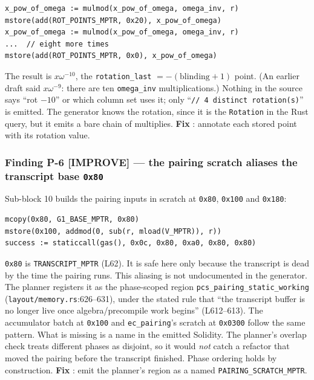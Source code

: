 \begin{lstlisting}[style=yul]
x_pow_of_omega := mulmod(x_pow_of_omega, omega_inv, r)
mstore(add(ROT_POINTS_MPTR, 0x20), x_pow_of_omega)
x_pow_of_omega := mulmod(x_pow_of_omega, omega_inv, r)
...  // eight more times
mstore(add(ROT_POINTS_MPTR, 0x0), x_pow_of_omega)
\end{lstlisting}

The result is $x\omega^{-10}$, the \texttt{rotation\_last}
$=-(\text{blinding}+1)$ point. (An earlier draft said $x\omega^{-9}$:
there are ten \texttt{omega\_inv} multiplications.) Nothing in the
source says ``rot $-10$'' or which column set uses it; only
``\texttt{/\allowbreak{}/\allowbreak{} 4 distinct rotation(s)}'' is emitted. The generator
knows the rotation, since it is the \texttt{Rotation} in the Rust
query, but it emits a bare chain of multiplies. \textbf{Fix}
: annotate each stored point with its rotation value.

\subsubsection*{Finding P-6 \textcolor{codegenblue}{[IMPROVE]} --- the pairing scratch aliases the transcript base \texttt{0x80}}

Sub-block 10 builds the pairing inputs in scratch at \texttt{0x80},
\texttt{0x100} and \texttt{0x180}:

\begin{lstlisting}[style=yul]
mcopy(0x80, G1_BASE_MPTR, 0x80)
mstore(0x100, addmod(0, sub(r, mload(V_MPTR)), r))
success := staticcall(gas(), 0x0c, 0x80, 0xa0, 0x80, 0x80)
\end{lstlisting}

\texttt{0x80} is \texttt{TRANSCRIPT\_MPTR} (L62). It is safe here
only because the transcript is dead by the time the pairing runs.
 This aliasing is not undocumented in the
generator. The planner registers it as the phase-scoped region
\texttt{pcs\_\allowbreak{}pairing\_\allowbreak{}static\_\allowbreak{}working}
(\texttt{layout/memory.rs}:626--631), under the stated rule that
``the transcript buffer is no longer live once algebra/precompile
work begins'' (L612--613). The accumulator batch at \texttt{0x100}
and \texttt{ec\_pairing}'s scratch at \texttt{0x0300} follow the
same pattern. What is missing is a name in the emitted Solidity.
The planner's overlap check treats different phases as disjoint, so
it would \emph{not} catch a refactor that moved the pairing before
the transcript finished. Phase ordering holds by construction.
\textbf{Fix} : emit the planner's region as a named
\texttt{PAIRING\_\allowbreak{}SCRATCH\_\allowbreak{}MPTR}.

